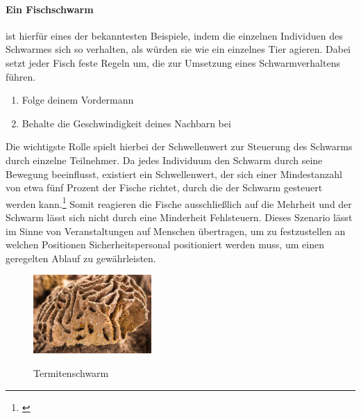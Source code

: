 \paragraph{Ein Fischschwarm}
ist hierfür eines der bekanntesten Beispiele, indem die einzelnen Individuen des Schwarmes sich so verhalten, als würden sie wie ein einzelnes Tier agieren. Dabei setzt jeder Fisch feste Regeln um, die zur Umsetzung eines Schwarmverhaltens führen.
\begin{enumerate}
	\item Folge deinem Vordermann
	\item Behalte die Geschwindigkeit deines Nachbarn bei
\end{enumerate}
\noindent
Die wichtigste Rolle spielt hierbei der Schwellenwert zur Steuerung des Schwarms durch einzelne Teilnehmer. Da jedes Individuum den Schwarm durch seine Bewegung beeinflusst, existiert ein Schwellenwert, der sich einer Mindestanzahl von etwa fünf Prozent der Fische richtet, durch die der Schwarm gesteuert werden kann.\footnote{\citep[vgl.][Logistik Schwarmintelligenz]{Stober.Logistik:Schwarmintelligenz}\label{note47}} Somit reagieren die Fische ausschließlich auf die Mehrheit und der Schwarm lässt sich nicht durch eine Minderheit Fehlsteuern. Dieses Szenario lässt im Sinne von Veranstaltungen auf Menschen übertragen, um zu festzustellen an welchen Positionen Sicherheitspersonal positioniert werden muss, um einen geregelten Ablauf zu gewährleisten.
\begin{figure}
	\begin{center}
		\includegraphics[width=0.4\textwidth]{images/technische_grundlagen/termitenschwarm.jpg}
	\end{center}
	\caption{Termitenschwarm}
	\cite{Dreamstime.Nestvon}
	\label{fig:termitenschwarm}
\end{figure}

\noindent
